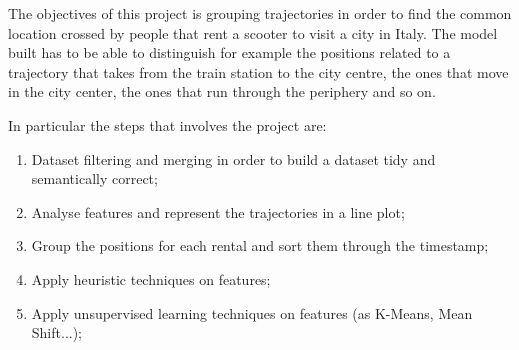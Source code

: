 The objectives of this project is grouping trajectories in order to find the common location crossed by people that rent a scooter to visit a city in Italy. The model built has to be able to distinguish for example the positions related to a trajectory that takes from the train station to the city centre, the ones that move in the city center, the ones that run through the periphery and so on. 

In particular the steps that involves the project are:
\begin{enumerate}
	\item Dataset filtering and merging in order to build a dataset tidy and semantically correct;
	\item Analyse features and represent the trajectories in a line plot;
	\item Group the positions for each rental and sort them through the timestamp;
	\item Apply heuristic techniques on features;
	\item Apply unsupervised learning techniques on features (as K-Means, Mean Shift...);  
\end{enumerate}

